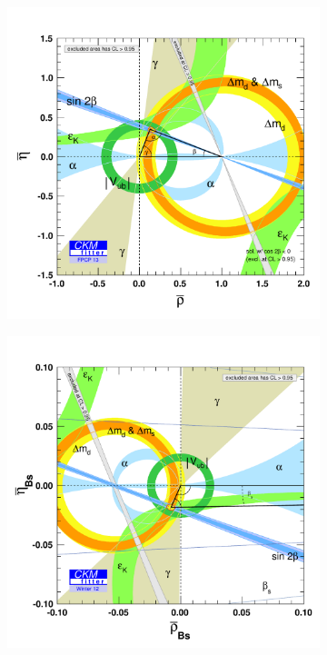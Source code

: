 \begin{figure}[tb]
  \centering
  \begin{subfigure}{0.495\textwidth}
    \includegraphics[trim=5mm 2mm 3mm 15mm, clip=true, width=\textwidth]{graphics/intro/rhoeta_large}
    \caption{}
  \end{subfigure}%
  \begin{subfigure}{0.495\textwidth}
    \includegraphics[trim=6mm 2mm 2mm 15mm, clip=true, width=\textwidth]{graphics/intro/rhoBsetaBs_large_global}

\end{subfigure}
\end{figure}
